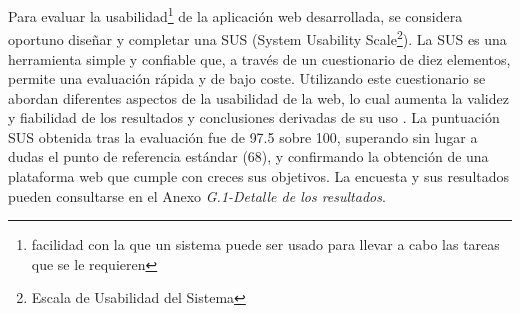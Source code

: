 Para evaluar la usabilidad\footnote{facilidad con la que un sistema puede ser usado para llevar a cabo las tareas que se le requieren} de la aplicación web desarrollada, se considera oportuno diseñar y completar una SUS (System Usability Scale\footnote{Escala de Usabilidad del Sistema}). La SUS es una herramienta simple y confiable que, a través de un cuestionario de diez elementos, permite una evaluación rápida y de bajo coste. Utilizando este cuestionario se abordan diferentes aspectos de la usabilidad de la web, lo cual aumenta la validez y fiabilidad de los resultados y conclusiones derivadas de su uso \cite{SUS}. La puntuación SUS obtenida tras la evaluación fue de 97.5 sobre 100, superando sin lugar a dudas el punto de referencia estándar (68), y confirmando la obtención de una plataforma web que cumple con creces sus objetivos. La encuesta y sus resultados pueden consultarse en el Anexo \textit{G.1-Detalle de los resultados}.


    
